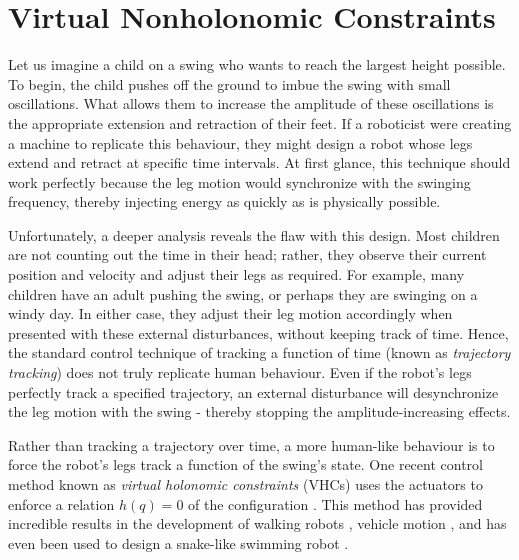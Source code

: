 \section{Virtual Nonholonomic Constraints}
Let us imagine a child on a swing who wants to reach the largest height
possible. 
To begin, the child pushes off the ground to imbue the swing with small oscillations.
What allows them to increase the amplitude of these oscillations is the
appropriate extension and retraction of their feet.
If a roboticist were creating a machine to replicate this behaviour, they might
design a robot whose legs extend and retract at specific time intervals. 
At first glance, this technique should work perfectly because the leg motion
would synchronize with the swinging frequency, thereby injecting energy as
quickly as is physically possible.

Unfortunately, a deeper analysis reveals the flaw with this design.
Most children are not counting out the time in their head; rather, they observe
their current position and velocity and adjust their legs as required. 
For example, many children have an adult pushing the swing, or perhaps
they are swinging on a windy day. In either case, they adjust their leg
motion accordingly when presented with these external disturbances, without
keeping track of time. 
Hence, the standard control technique of tracking a function of time (known as
\textit{trajectory tracking}) does not truly replicate human behaviour.
Even if the robot's legs perfectly track a specified trajectory, 
an external disturbance will desynchronize the leg motion
with the swing - thereby stopping the amplitude-increasing effects.

Rather than tracking a trajectory over time, a more human-like behaviour 
is to force the robot's legs track a function of the swing's state. 
One recent control method known as \textit{virtual holonomic constraints} (VHCs)
uses the actuators to enforce a relation \(h(q) = 0\) of the configuration
\cite{vhcs_for_el_systems}. 
This method has provided incredible results in the development of 
walking robots \cite{vhc_robotic_walking, vhc_stable_walking}, 
vehicle motion \cite{vhc_bicycle, vhc_helicopter}, 
and has even been used to design a snake-like swimming robot
\cite{vhc_snake}.


